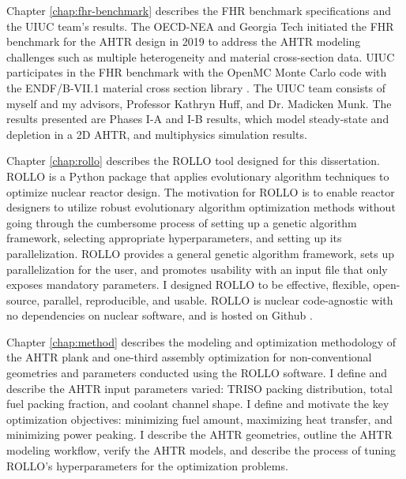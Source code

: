 Chapter \ref{chap:fhr-benchmark} describes the \gls{FHR} benchmark specifications and 
the \gls{UIUC} team's results.
The \gls{OECD}-\gls{NEA} and \gls{Georgia Tech} initiated the \gls{FHR} 
benchmark for the \gls{AHTR} design in 2019 \cite{petrovic_benchmark_2021} 
to address the \gls{AHTR} modeling challenges such as multiple heterogeneity and 
material cross-section data. 
\gls{UIUC} participates in the \gls{FHR} benchmark with the OpenMC Monte Carlo code 
\cite{romano_openmc_2013} with the ENDF/B-VII.1 material cross section library 
\cite{chadwick_endf/b-vii.1_2011}.
The \gls{UIUC} team consists of myself and my advisors, Professor Kathryn Huff, 
and Dr. Madicken Munk. 
The results presented are Phases I-A and I-B results, which model steady-state and 
depletion in a 2D \gls{AHTR}, and multiphysics simulation results. 

Chapter \ref{chap:rollo} describes the \acrfull{ROLLO} tool designed for this 
dissertation. 
\gls{ROLLO} is a Python package that applies evolutionary algorithm 
techniques to optimize nuclear reactor design. 
The motivation for \gls{ROLLO} is to enable reactor designers to utilize 
robust evolutionary algorithm optimization methods without going 
through the cumbersome process of setting up a genetic algorithm framework,
selecting appropriate hyperparameters, and setting up its parallelization. 
\gls{ROLLO} provides a general genetic algorithm framework, sets up 
parallelization for the user, and promotes usability with an input file 
that only exposes mandatory parameters.
I designed  \gls{ROLLO} to be effective, flexible, open-source, parallel, 
reproducible, and usable. 
\gls{ROLLO} is nuclear code-agnostic with no dependencies on  
nuclear software, and is hosted on Github \cite{chee_rollo_2021}. 

Chapter \ref{chap:method} describes the modeling and optimization methodology of the 
\gls{AHTR} plank and one-third assembly optimization for non-conventional 
geometries and parameters conducted using the \gls{ROLLO} software.
I define and describe the \gls{AHTR} input parameters varied: \gls{TRISO} packing 
distribution, total fuel packing fraction, and coolant channel shape.
I define and motivate the key optimization objectives: minimizing fuel amount,
maximizing heat transfer, and minimizing power peaking.
I describe the \gls{AHTR} geometries, outline the \gls{AHTR} modeling workflow, 
verify the \gls{AHTR} models, and describe the process of tuning \gls{ROLLO}'s 
hyperparameters for the optimization problems.

